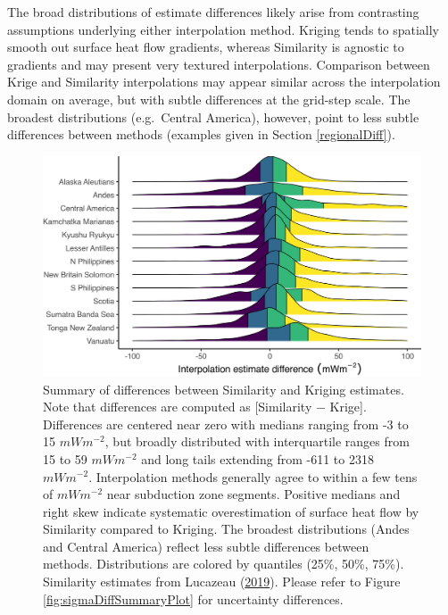 The broad distributions of estimate differences likely arise from contrasting assumptions underlying either interpolation method. Kriging tends to spatially smooth out surface heat flow gradients, whereas Similarity is agnostic to gradients and may present very textured interpolations. Comparison between Krige and Similarity interpolations may appear similar across the interpolation domain on average, but with subtle differences at the grid-step scale. The broadest distributions (e.g.~Central America), however, point to less subtle differences between methods (examples given in Section \ref{regionalDiff}).



\begin{figure}[htbp]

{\centering \includegraphics[width=1\linewidth,]{assets/figs/chpt3/interpDiffSummary} 

}

\caption[Summary of differences between Similarity and Kriging estimates]{Summary of differences between Similarity and Kriging estimates. Note that differences are computed as {[}Similarity \(-\) Krige{]}. Differences are centered near zero with medians ranging from -3 to 15 \(mWm^{-2}\), but broadly distributed with interquartile ranges from 15 to 59 \(mWm^{-2}\) and long tails extending from -611 to 2318 \(mWm^{-2}\). Interpolation methods generally agree to within a few tens of \(mWm^{-2}\) near subduction zone segments. Positive medians and right skew indicate systematic overestimation of surface heat flow by Similarity compared to Kriging. The broadest distributions (Andes and Central America) reflect less subtle differences between methods. Distributions are colored by quantiles (25\%, 50\%, 75\%). Similarity estimates from Lucazeau (\protect\hyperlink{ref-lucazeau2019}{2019}). Please refer to Figure \ref{fig:sigmaDiffSummaryPlot} for uncertainty differences.}\label{fig:diffSummaryPlot}
\end{figure}

